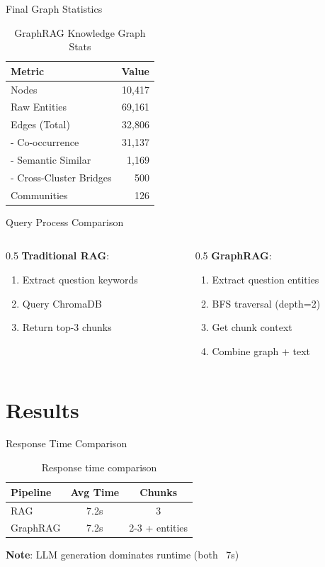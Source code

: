 \documentclass{beamer}
\begin{document}
\begin{frame}{Final Graph Statistics}
\begin{table}
\centering
\begin{tabular}{|l|r|}
\hline
\textbf{Metric} & \textbf{Value} \\
\hline
Nodes & 10,417 \\
Raw Entities & 69,161 \\
Edges (Total) & 32,806 \\
- Co-occurrence & 31,137 \\
- Semantic Similar & 1,169 \\
- Cross-Cluster Bridges & 500 \\
Communities & 126 \\
\hline
\end{tabular}
\caption{GraphRAG Knowledge Graph Stats}
\end{table}
\end{frame}

\begin{frame}{Query Process Comparison}
\begin{columns}
\begin{column}{0.5\textwidth}
\textbf{Traditional RAG}:
\begin{enumerate}
\item Extract question keywords
\item Query ChromaDB
\item Return top-3 chunks
\end{enumerate}
\end{column}
\begin{column}{0.5\textwidth}
\textbf{GraphRAG}:
\begin{enumerate}
\item Extract question entities
\item BFS traversal (depth=2)
\item Get chunk context
\item Combine graph + text
\end{enumerate}
\end{column}
\end{columns}
\end{frame}

\section{Results}
\begin{frame}{Response Time Comparison}
\begin{table}
\centering
\begin{tabular}{|l|c|c|}
\hline
\textbf{Pipeline} & \textbf{Avg Time} & \textbf{Chunks} \\
\hline
RAG & 7.2s & 3 \\
GraphRAG & 7.2s & 2-3 + entities \\
\hline
\end{tabular}
\caption{Response time comparison}
\end{table}
\textbf{Note}: LLM generation dominates runtime (both ~7s)
\end{frame}
\end{document}
